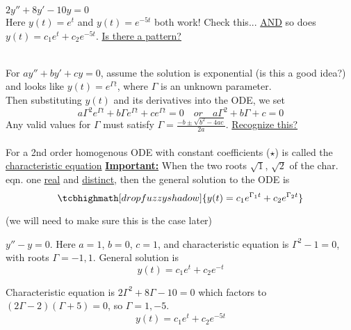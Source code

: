 \begin{example-N}
	$2y'' + 8y' -10y = 0$\\
	Here $y(t) = e^t$ and $y(t) = e^{-5t}$ both work! Check this... \underline{AND} so does $y(t) = c_1 e^t + c_2 e^{-5t}$. \underline{Is there a pattern?}
\end{example-N}
\redhline\\
For $ay'' + by' + cy = 0$, assume the solution is exponential (is this a good idea?) and looks like $y(t) = e^{\Gamma t}$, where $\Gamma$ is an unknown parameter.\\
Then substituting $y(t)$ and its derivatives into the ODE, we set
\begin{equation*}
	a\Gamma^2e^{\Gamma t} + b\Gamma e^{\Gamma t} + ce^{\Gamma t} = 0 \quad \textit{or} \quad a\Gamma^2 + b\Gamma + c = 0
\end{equation*}
Any valid values for $\Gamma$ must satisfy $\Gamma = \frac{-b \pm \sqrt{b^2 - 4ac}}{2a}$. \underline{Recognize this?}\\\\
For a 2nd order homogenous ODE with constant coefficients ($\star$) is called the \underline{characteristic equation}
\underline{\large \textbf{Important:}} When the two roots $\sqrt{1}$, $\sqrt{2}$ of the char. eqn. one \underline{real} and \underline{distinct}, then the general solution to the ODE is
\begin{equation*}
	\tcbhighmath[drop fuzzy shadow]{y(t) = c_1 e^{\Gamma_1 t} + c_2 e^{\Gamma_2 t}}
\end{equation*}
\begin{center}
	(we will need to make sure this is the case later)
\end{center}
\begin{example} $y''-y = 0$. Here $a = 1$, $b=0$, $c=1$, and characteristic equation is $\Gamma^2 - 1 = 0$, with roots $\Gamma = -1, 1$. General solution is 
\begin{equation*}
	y(t) = c_1e^t + c_2e^{-t}
\end{equation*}
\end{example}
\begin{example}
Characteristic equation is $2\Gamma^2 + 8\Gamma -10 = 0$ which factors to $(2\Gamma - 2)(\Gamma + 5) = 0$, so $\Gamma = 1, -5$.
\begin{equation*}
		y(t) = c_1e^t + c_2e^{-5t}	
\end{equation*}	
\end{example}

